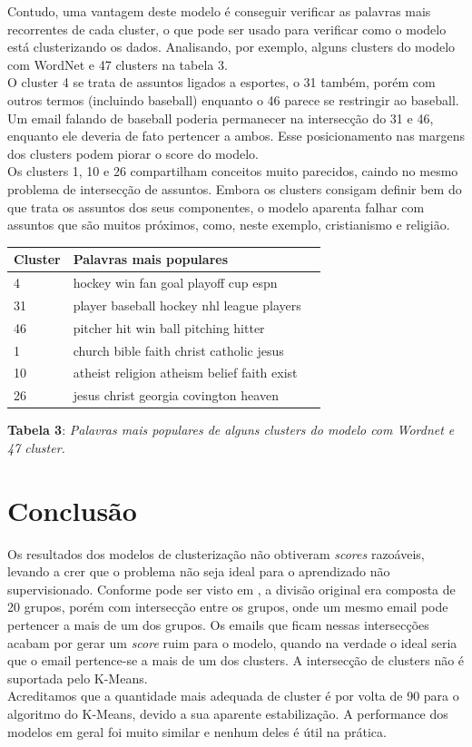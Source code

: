 \documentclass[conference]{IEEEtran}
\begin{document}
Contudo, uma vantagem deste modelo é conseguir verificar as palavras mais recorrentes de cada cluster, o que pode ser usado para verificar como o modelo está clusterizando os dados. Analisando, por exemplo, alguns clusters do modelo com WordNet e 47 clusters na tabela 3. \\
O cluster 4 se trata de assuntos ligados a esportes, o 31 também, porém com outros termos (incluindo baseball) enquanto o 46 parece se restringir ao baseball. Um email falando de baseball poderia permanecer na intersecção do 31 e 46, enquanto ele deveria de fato pertencer a ambos. Esse posicionamento nas margens dos clusters podem piorar o score do modelo.\\
Os clusters 1, 10 e 26 compartilham conceitos muito parecidos, caindo no mesmo problema de intersecção de assuntos. Embora os clusters consigam definir bem do que trata os assuntos dos seus componentes, o modelo aparenta falhar com assuntos que são muitos próximos, como, neste exemplo, cristianismo e religião.

\begin{center}
\begin{tabular}{| l | l | l |}
 \hline
 \textbf{Cluster} &  \textbf{Palavras mais populares}   \\ \hline
   4 & hockey win fan goal playoff cup espn \\ \hline
  31 & player baseball hockey nhl league players \\ \hline
  46 & pitcher hit win ball pitching hitter \\ \hline
   1 & church bible faith christ catholic jesus \\ \hline
  10 & atheist religion atheism belief faith exist \\ \hline
  26 & jesus christ georgia covington heaven \\ \hline
\end{tabular} \newline

\textbf{Tabela 3}: \textit{Palavras mais populares de alguns clusters do modelo com Wordnet e 47 cluster.}
\end{center}

\section{Conclusão}
Os resultados dos modelos de clusterização não obtiveram \textit{scores} razoáveis, levando a crer que o problema não seja ideal para o aprendizado não supervisionado. Conforme pode ser visto em \cite{b4}, a divisão original era composta de 20 grupos, porém com intersecção entre os grupos, onde um mesmo email pode pertencer a mais de um dos grupos. Os emails que ficam nessas intersecções acabam por gerar um \textit{score} ruim para o modelo, quando na verdade o ideal seria que o email pertence-se a mais de um dos clusters. A intersecção de clusters não é suportada pelo K-Means.\\
Acreditamos que a quantidade mais adequada de cluster é por volta de 90 para o algoritmo do K-Means, devido a sua aparente estabilização. A performance dos modelos em geral foi muito similar e nenhum deles é útil na prática.\\
\end{document}
